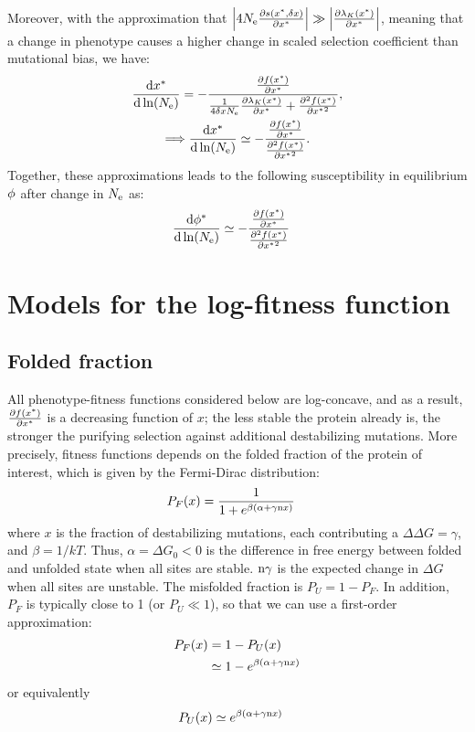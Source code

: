 Moreover, with the approximation that $\left| 4 N_{\mathrm{e}} \frac{ \partial s(x^{*}, \delta x) }{\partial x^{*} } \right| \gg \left| \frac{\partial \lambda_K (x^{*}) }{\partial x^{*} } \right|$, meaning that a change in phenotype causes a higher change in scaled selection coefficient than mutational bias, we have:
\begin{gather}
\frac{ \mathrm{d} x^{*}}{\mathrm{d} \ln (N_{\mathrm{e}})}  = - \frac{\frac{ \partial f (x^{*}) }{\partial {x^{*}}}}{\frac{1}{4 \delta x N_{\mathrm{e}}} \frac{\partial \lambda_K (x^{*}) }{\partial x^{*} } + \frac{ \partial^2 f (x^{*}) }{\partial {x^{*}}^2}},\\
\Longrightarrow \frac{ \mathrm{d} x^{*}}{\mathrm{d} \ln (N_{\mathrm{e}})}  \simeq - \frac{\frac{ \partial f (x^{*}) }{\partial {x^{*}}}}{\frac{ \partial^2 f (x^{*}) }{\partial {x^{*}}^2}}. \label{eq:approx_dx_dlnNe}
\end{gather}
Together, these approximations leads to the following susceptibility in equilibrium $\phi$ after change in $N_{\mathrm{e}}$ as:
\begin{align}
\frac{ \mathrm{d} \phi^{*}}{\mathrm{d} \ln (N_{\mathrm{e}})} & \simeq - \frac{\frac{ \partial f (x^{*}) }{\partial {x^{*}}}}{\frac{ \partial^2 f (x^{*}) }{\partial {x^{*}}^2}}\label{eq:approx_dw_dlnNe}
\end{align}
\section{Models for the log-fitness function}
\subsection{Folded fraction}
All phenotype-fitness functions considered below are log-concave, and as a result, $\frac{ \partial f (x^{*}) }{\partial {x^{*}}}$ is a decreasing function of $x$; the less stable the protein already is, the stronger the purifying selection against additional destabilizing mutations. More precisely, fitness functions depends on the folded fraction of the protein of interest, which is given by the Fermi-Dirac distribution:
\begin{align}
P_{F} (x) & = \frac{1}{1 + e^{\beta(\alpha + \gamma \text{n} x)}}
\end{align}
where $x$ is the fraction of destabilizing mutations, each contributing a $\Delta \Delta G = \gamma$, and $\beta = 1 / kT$. Thus, $\alpha = \Delta G_0 < 0$ is the difference in free energy between folded and unfolded state when all sites are stable. $\text{n} \gamma$ is the expected change in $\Delta G$ when all sites are unstable. The misfolded fraction is  $P_{U} = 1-P_{F}$. In addition, $P_{F}$ is typically close to 1 (or $P_{U} \ll 1$), so that we can use a first-order approximation:
\begin{align}
P_{F}(x) & = 1 - P_{U}(x) \\
& \simeq 1 - e^{\beta(\alpha + \gamma \text{n} x)}
\end{align}
or equivalently
\begin{align}
P_{U}(x) & \simeq e^{\beta(\alpha + \gamma \text{n} x)}
\end{align}
